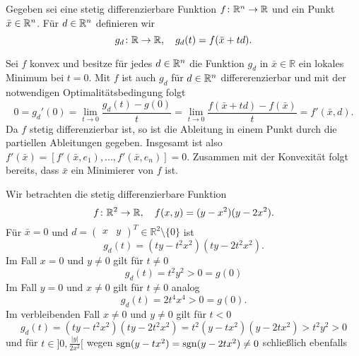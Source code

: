 
Gegeben sei eine stetig differenzierbare Funktion $f\colon \mathbb{R}^n\to\mathbb{R}$ und ein Punkt $\bar x\in\mathbb{R}^n$.
Für $d\in\mathbb{R}^n$ definieren wir
\begin{displaymath}
 g_d\colon \mathbb{R}\to\mathbb{R} , \quad g_d(t)=f(\bar x+td). 
\end{displaymath}
\begin{compactenum}[(i)]
 \item Sei $f$ konvex und besitze für jedes $d\in\mathbb{R}^n$ die Funktion $g_d$ in $\bar x\in\mathbb{R}$ ein lokales Minimum bei $t=0$.
 Mit $f$ ist auch $g_d$ für $d\in \mathbb{R}^n$ differerenzierbar und mit der notwendigen Optimalitätsbedingung folgt
 \begin{displaymath}
  0=g_d'(0)=\lim_{t\to 0} \frac{g_d(t)-g(0)}{t}=\lim_{t\to0}\frac{f(\bar x+td)-f(\bar x)}{t}=f'(\bar x,d).
 \end{displaymath}
 Da $f$ stetig differenzierbar ist, so ist die Ableitung in einem Punkt durch die partiellen Ableitungen gegeben.
 Insgesamt ist also $f'(\bar x)=[f'(\bar x,e_1),...,f'(\bar x,e_n)]=0$. Zusammen mit der Konvexität folgt bereits, dass $\bar x$ ein Minimierer von $f$ ist.
 \\
 \item Wir betrachten die stetig differenzierbare Funktion
 \begin{displaymath}
 f\colon \mathbb{R}^2\to\mathbb{R},\quad f(x,y)=(y-x^2)(y-2x^2).
 \end{displaymath}
 Für $\bar x=0$ und $d=\begin{pmatrix}x&y\end{pmatrix}^T\in\mathbb{R}^2\setminus\{0\}$ ist 
 \begin{displaymath}
  g_d(t)=(ty-t^2x^2)(ty-2t^2x^2).
 \end{displaymath} 
 Im Fall $x=0$ und $y\neq 0$ gilt für $t\neq 0$
 \begin{displaymath}
  g_d(t)=t^2y^2>0=g(0)
 \end{displaymath}
 Im Fall $y=0$ und $x\neq 0$ gilt für $t\neq 0$ analog
 \begin{displaymath}
   g_d(t)=2t^4x^4>0=g(0).
 \end{displaymath}
Im verbleibenden Fall $x\neq 0$ und $y\neq 0$ gilt für $t<0$
 \begin{displaymath}
   g_d(t)=(ty-t^2x^2)(ty-2t^2x^2)=t^2(y-tx^2)(y-2tx^2)>t^2y^2>0
 \end{displaymath}
und für $t\in]0,\frac{|y|}{2x^2}[$ wegen $\operatorname{sgn}(y-tx^2)=\operatorname{sgn}(y-2tx^2)\neq 0$ schließlich ebenfalls
 \begin{displaymath}

\end{displaymath}
\end{compactenum}
